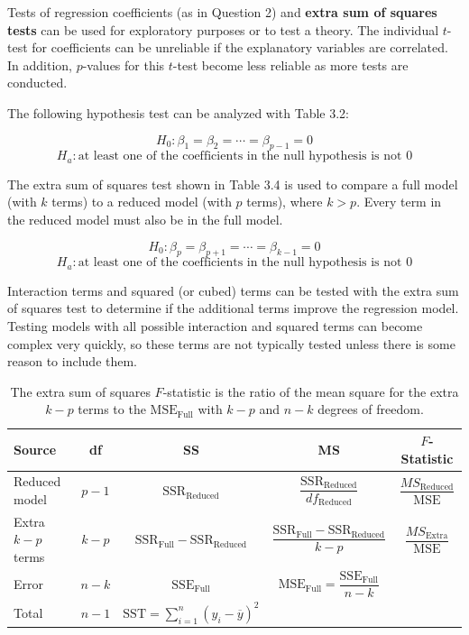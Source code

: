\documentclass[
]{report}
\begin{document}
Tests of regression coefficients (as in Question 2) and \textbf{extra sum of squares tests} can be used for exploratory purposes or to test a theory. The individual \(\scriptstyle t\)-test for coefficients can be unreliable if the explanatory variables are correlated. In addition, \(\scriptstyle p\)-values for this \(\scriptstyle t\)-test become less reliable as more tests are conducted.

The following hypothesis test can be analyzed with Table 3.2:

\[
H_0\!: \beta_1 = \beta_2 = \cdots = \beta_{p-1} = 0
\]
\[
H_a\!: \text{at least one of the coefficients in the null hypothesis is not 0}
\]

The extra sum of squares test shown in Table 3.4 is used to compare a full model (with \(\scriptstyle k\) terms) to a reduced model (with \(\scriptstyle p\) terms), where \(\scriptstyle k > p\). Every term in the reduced model must also be in the full model.

\[
H_0\!: \beta_p = \beta_{p+1} = \cdots = \beta_{k-1} = 0
\]
\[
H_a\!: \text{at least one of the coefficients in the null hypothesis is not 0}
\]

Interaction terms and squared (or cubed) terms can be tested with the extra sum of squares test to determine if the additional terms improve the regression model. Testing models with all possible interaction and squared terms can become complex very quickly, so these terms are not typically tested unless there is some reason to include them.

\begin{table}[!h]
\centering
\caption{\label{tab:tab34}The extra sum of squares $F$-statistic is the ratio of the mean square for the extra $k-p$ terms to the $\text{MSE}_{\text{Full}}$ with $k-p$ and $n-k$ degrees of freedom.}
\centering
\begin{tabular}[t]{lcccc}
\toprule
Source & df & SS & MS & $F$-Statistic\\
\midrule
Reduced model & $p - 1$ & $\text{SSR}_{\text{Reduced}}$ & $\dfrac{\text{SSR}_{\text{Reduced}}}{df_{\text{Reduced}}}$ & $\dfrac{MS_{\text{Reduced}}}{\text{MSE}}$\\
Extra $k - p$ terms & $k - p$ & $\text{SSR}_{\text{Full}} - \text{SSR}_{\text{Reduced}}$ & $\dfrac{\text{SSR}_{\text{Full}} - \text{SSR}_{\text{Reduced}}}{k-p}$ & $\dfrac{MS_{\text{Extra}}}{\text{MSE}}$\\
Error & $n - k$ & $\text{SSE}_{\text{Full}}$ & $\text{MSE}_{\text{Full}} = \dfrac{\text{SSE}_{\text{Full}}}{n - k}$ & \\
Total & $n - 1$ & $\text{SST} = \sum_{i=1}^n (y_i - \overline{y})^2$ &  & \\
\bottomrule
\end{tabular}
\end{table}
\end{document}
